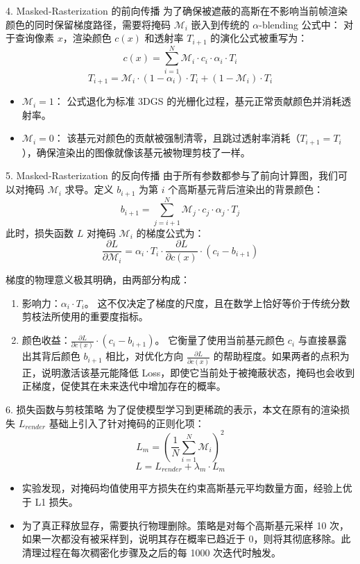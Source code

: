 \documentclass[aspectratio=169,10pt]{beamer}
\begin{document}
\begin{frame}[fragile,shrink=12]{4. Masked-Rasterization 的前向传播}
\footnotesize
为了确保被遮蔽的高斯在不影响当前帧渲染颜色的同时保留梯度路径，需要将掩码 \(\mathcal{M}_i\) 嵌入到传统的 \(\alpha\)-blending 公式中： 对于查询像素 \(x\)，渲染颜色 \(c(x)\) 和透射率 \(T_{i+1}\) 的演化公式被重写为： \[c(x) = \sum_{i=1}^{N} \mathcal{M}_{i} \cdot c_{i} \cdot \alpha_{i} \cdot T_{i}\] \[T_{i+1} = \mathcal{M}_{i} \cdot (1 - \alpha_{i}) \cdot T_{i} + (1 - \mathcal{M}_{i}) \cdot T_{i}\]
\begin{itemize}
\item \alert{\(\mathcal{M}_i = 1\)：} 公式退化为标准 3DGS 的光栅化过程，基元正常贡献颜色并消耗透射率。
\item \alert{\(\mathcal{M}_i = 0\)：} 该基元对颜色的贡献被强制清零，且跳过透射率消耗（\(T_{i+1} = T_i\)），确保渲染出的图像就像该基元被物理剪枝了一样。
\end{itemize}
\end{frame}

\begin{frame}[fragile,shrink=12]{5. Masked-Rasterization 的反向传播}
\footnotesize
由于所有参数都参与了前向计算图，我们可以对掩码 \(\mathcal{M}_i\) 求导。定义 \(b_{i+1}\) 为第 \(i\) 个高斯基元背后渲染出的背景颜色： \[b_{i+1} = \sum_{j=i+1}^{N} \mathcal{M}_{j} \cdot c_{j} \cdot \alpha_{j} \cdot T_{j}\] 此时，损失函数 \(L\) 对掩码 \(\mathcal{M}_i\) 的梯度公式为： \[\frac{\partial L}{\partial \mathcal{M}_{i}} = \alpha_{i} \cdot T_{i} \cdot \frac{\partial L}{\partial c(x)} \cdot (c_{i} - b_{i+1})\]

\alert{梯度的物理意义极其明确，由两部分构成：}
\begin{enumerate}
\item \alert{影响力：\(\alpha_{i} \cdot T_{i}\)。} 这不仅决定了梯度的尺度，且在数学上恰好等价于传统分数剪枝法所使用的重要度指标。
\item \alert{颜色收益：\(\frac{\partial L}{\partial c(x)} \cdot (c_{i} - b_{i+1})\)。} 它衡量了使用当前基元颜色 \(c_i\) 与直接暴露出其背后颜色 \(b_{i+1}\) 相比，对优化方向 \(\frac{\partial L}{\partial c(x)}\) 的帮助程度。如果两者的点积为正，说明激活该基元能降低 Loss，即使它当前处于被掩蔽状态，掩码也会收到正梯度，促使其在未来迭代中增加存在的概率。
\end{enumerate}
\end{frame}

\begin{frame}[fragile,shrink=12]{6. 损失函数与剪枝策略}
\footnotesize
为了促使模型学习到更稀疏的表示，本文在原有的渲染损失 \(L_{render}\) 基础上引入了针对掩码的正则化项： \[L_{m} = \left( \frac{1}{N} \sum_{i=1}^{N} \mathcal{M}_{i} \right)^{2}\] \[L = L_{render} + \lambda_{m} \cdot L_{m}\]
\begin{itemize}
\item 实验发现，对掩码均值使用平方损失在约束高斯基元平均数量方面，经验上优于 L1 损失。
\item 为了真正释放显存，需要执行物理删除。策略是对每个高斯基元采样 10 次，如果一次都没有被采样到，说明其存在概率已趋近于 0，则将其彻底移除。此清理过程在每次稠密化步骤及之后的每 1000 次迭代时触发。
\end{itemize}
\end{frame}
\end{document}
